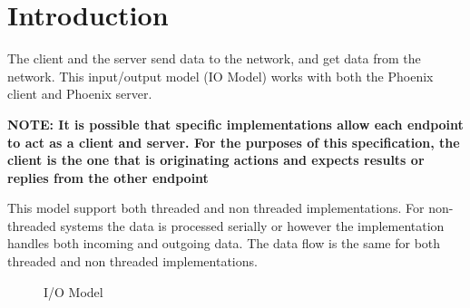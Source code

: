 \section{Introduction}
The client and the server send data to the network, and get
data from the network.
This \mbox{input/output} model (IO Model) works with
both the Phoenix client and Phoenix server.

\textbf{NOTE: It is possible that specific implementations allow
  each endpoint to act as a client and server.
  For the purposes of this specification, the client is
  the one that is originating actions and expects
  results or replies from the other endpoint}

This model support both threaded and non threaded
implementations.
For non-threaded systems the data is processed serially
or however the implementation handles both incoming
and outgoing data.
The data flow is the same for both threaded and non threaded
implementations.

\begin{figure}
  \centering
  \caption{I/O Model}
  \label{fig:IOModel}
  
\end{figure}

